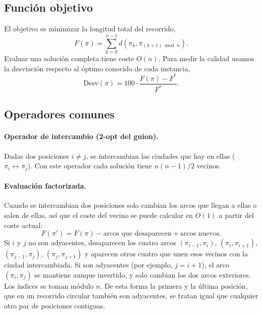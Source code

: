 \subsection{Función objetivo}

El objetivo es minimizar la longitud total del recorrido,
\begin{equation}
F(\pi) = \sum_{k=0}^{n-1} d\left(\pi_k, \pi_{(k+1) \bmod n}\right).
\end{equation}
Evaluar una solución completa tiene coste $O(n)$. Para medir la calidad usamos la desviación respecto al óptimo conocido de cada instancia,
\begin{equation}
\text{Desv}(\pi) = 100 \cdot \frac{F(\pi) - F^{*}}{F^{*}}.
\end{equation}

\subsection{Operadores comunes}

\paragraph{Operador de intercambio (2-opt del guion).} Dadas dos posiciones $i \neq j$, se intercambian las ciudades que hay en ellas ($\pi_i \leftrightarrow \pi_j$). Con este operador cada solución tiene $n(n-1)/2$ vecinos.

\paragraph{Evaluación factorizada.} Cuando se intercambian dos posiciones solo cambian los arcos que llegan a ellas o salen de ellas, así que el coste del vecino se puede calcular en $O(1)$ a partir del coste actual:
\begin{equation}
F(\pi') = F(\pi) - \text{arcos que desaparecen} + \text{arcos nuevos}.
\end{equation}
Si $i$ y $j$ no son adyacentes, desaparecen los cuatro arcos $(\pi_{i-1},\pi_i)$, $(\pi_i,\pi_{i+1})$, $(\pi_{j-1},\pi_j)$, $(\pi_j,\pi_{j+1})$ y aparecen otros cuatro que unen esos vecinos con la ciudad intercambiada. Si son adyacentes (por ejemplo, $j = i+1$), el arco $(\pi_i, \pi_j)$ se mantiene aunque invertido, y solo cambian los dos arcos exteriores. Los índices se toman módulo $n$. De esta forma la primera y la última posición, que en un recorrido circular también son adyacentes, se tratan igual que cualquier otro par de posiciones contiguas.

